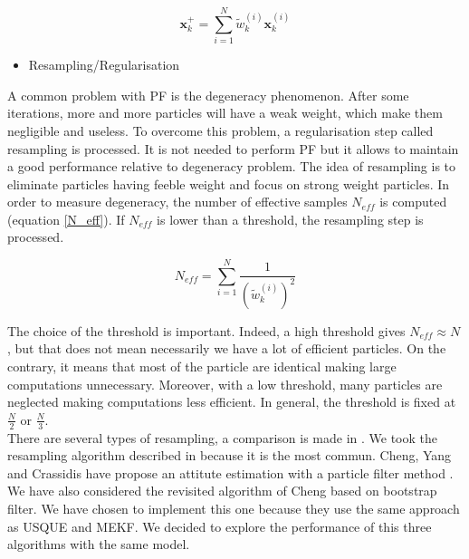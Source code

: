 \begin{equation}
 \textbf{x}_k^+ = \sum_{i=1}^N\tilde{w}_k^{(i)} \textbf{x}_k^{(i)}
 \end{equation}



\begin{itemize}
\item Resampling/Regularisation
\end{itemize}

A common problem with PF is the degeneracy phenomenon. After some iterations, more and more particles will have a weak weight, which make them negligible and useless.  To overcome this problem, a regularisation step called resampling is processed. It is not needed to perform PF but it allows to maintain a good performance relative to degeneracy problem. The idea of resampling is to eliminate particles having feeble weight and focus on strong weight particles. In order to measure degeneracy, the number of effective samples $N_{eff}$ is computed (equation \ref{N_eff}). If  $N_{eff}$ is lower than a threshold, the resampling step is processed.

\begin{equation}
 N_{eff} = \sum_{i=1}^N\frac{1}{(\tilde{w}_k^{(i)})^2}
 \label{N_eff}
 \end{equation}


The choice of the threshold is important. Indeed, a high threshold gives $N_{eff} \approx N$, but that does not mean necessarily we have a lot of efficient particles. On the contrary, it means that most of the particle are identical making large computations unnecessary. Moreover, with a low threshold, many particles are neglected making computations less efficient. In general, the threshold is fixed at  $\frac{N}{2}$ or $\frac{N}{3}$.\\

There are several types of resampling, a comparison is made in \cite{douc2005comparison}. We took the resampling algorithm described in \cite{arulampalam2002tutorial} because it is the most commun. Cheng, Yang and Crassidis have propose an attitute estimation with a particle filter method \cite{cheng_particle_2010}. We have also considered the revisited algorithm of Cheng \cite{chang_particle_2014} based on bootstrap filter\cite{gordon1993novel}. We have chosen to implement this one because they use the same approach as USQUE \cite{crassidis_unscented_2003} and MEKF\cite{markley2003attitude}. We decided to explore the performance of this three algorithms with the same model. \\

